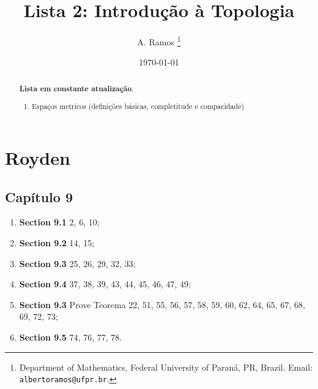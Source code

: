 \documentclass[latin,20pt]{article}
\begin{document}
\title{Lista 2: Introdução à Topologia }
 
\author{
A. Ramos \thanks{Department of Mathematics,
    Federal University of Paraná, PR, Brazil.
    Email: {\tt albertoramos@ufpr.br}.}
}

\date{\today}
 
\maketitle

\begin{abstract}
{\bf Lista em constante atualização}.
 \begin{enumerate}
 \item Espaços metricos (definições básicas, completitude e compacidade)
 \end{enumerate}
\end{abstract}

  
  \section*{Royden}
  \subsection*{Capítulo 9}
    \begin{enumerate}
    \item {\bf Section 9.1} 2, 6, 10;
    \item {\bf Section 9.2} 14, 15;
    \item {\bf Section 9.3} 25, 26, 29, 32, 33;
    \item {\bf Section 9.4} 37, 38, 39, 43, 44, 45, 46, 47, 49;
    \item {\bf Section 9.3} Prove Teorema 22, 51, 55, 56, 57, 58, 59, 60, 62, 64, 65, 67, 68, 69, 72, 73; 
    \item {\bf Section 9.5} 74, 76, 77, 78.
    \end{enumerate}
\end{document}
